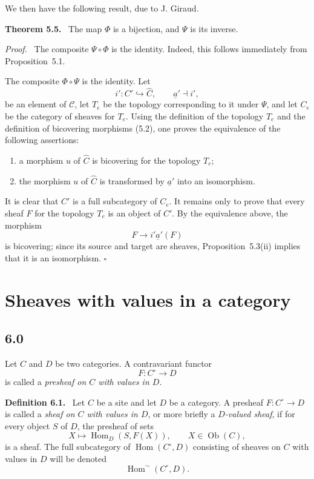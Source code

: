 \documentclass[11pt]{article}
\newcommand{\Hom}{\operatorname{Hom}}
\newcommand{\Ob}{\operatorname{Ob}}
\newcommand{\qedtext}{\hfill\(\square\)}
\newenvironment{statement}[1]{\par\medskip\noindent\textbf{#1.}\ }{\par\medskip}
\newenvironment{prooftext}{\par\noindent\emph{Proof.}\ }{\par\medskip}
\begin{document}
We then have the following result, due to J. Giraud.

\begin{statement}{Theorem 5.5}
The map \(\Phi\) is a bijection, and \(\Psi\) is its inverse.
\end{statement}

\begin{prooftext}
The composite \(\Psi\circ\Phi\) is the identity. Indeed, this follows immediately from Proposition~5.1.

The composite \(\Phi\circ\Psi\) is the identity. Let
\[
i':C'\hookrightarrow \widehat C,\qquad \underline a'\dashv i',
\]
be an element of \(\mathcal C\), let \(T_e\) be the topology corresponding to it under \(\Psi\), and let \(C_e\) be the category of sheaves for \(T_e\). Using the definition of the topology \(T_e\) and the definition of bicov\-ering morphisms (5.2), one proves the equivalence of the following assertions:
\begin{enumerate}[label=(\roman*)]
\item a morphism \(u\) of \(\widehat C\) is bicov\-ering for the topology \(T_e\);
\item the morphism \(u\) of \(\widehat C\) is transformed by \(\underline a'\) into an isomorphism.
\end{enumerate}
It is clear that \(C'\) is a full subcategory of \(C_e\). It remains only to prove that every sheaf \(F\) for the topology \(T_e\) is an object of \(C'\). By the equivalence above, the morphism
\[
F\longrightarrow i'\underline a'(F)
\]
is bicov\-ering; since its source and target are sheaves, Proposition~5.3(ii) implies that it is an isomorphism. \qedtext
\end{prooftext}

\section{Sheaves with values in a category}

\subsection*{6.0}
Let \(C\) and \(D\) be two categories. A contravariant functor
\[
F:C^\circ\to D
\]
is called a \emph{presheaf on \(C\) with values in \(D\)}.

\begin{statement}{Definition 6.1}
Let \(C\) be a site and let \(D\) be a category. A presheaf \(F:C^\circ\to D\) is called a \emph{sheaf on \(C\) with values in \(D\)}, or more briefly a \emph{\(D\)-valued sheaf}, if for every object \(S\) of \(D\), the presheaf of sets
\[
X\longmapsto \Hom_D(S,F(X)),\qquad X\in\Ob(C),
\]
is a sheaf. The full subcategory of \(\operatorname{Hom}(C^\circ,D)\) consisting of sheaves on \(C\) with values in \(D\) will be denoted
\[
\operatorname{Hom}^{\sim}(C^\circ,D).
\]
\end{statement}
\end{document}
